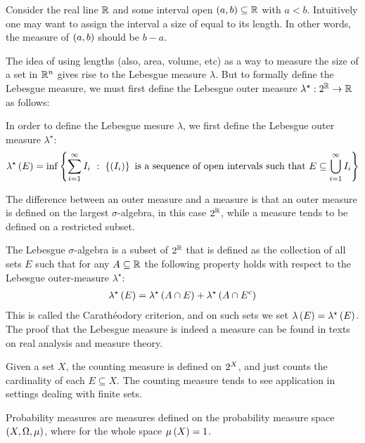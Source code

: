 \begin{example}
  Consider the real line \(\mathbb{R}\)
  and some interval open \(\left(a, b\right) \subseteq \mathbb{R}\) with \(a < b\).
  Intuitively one may want to assign the interval a size of
  equal to its length.
  In other words, the measure of \(\left(a, b\right)\) should be \(b - a\).

  The idea of using lengths (also, area, volume, etc) as a way to measure
  the size of a set in \(\mathbb{R}^n\) gives rise to the Lebesgue measure
  \(\lambda\).
  But to formally define the Lebesgue measure, we must first
  define the Lebesgue outer measure
  \(\lambda^\star : 2^{\mathbb{R}} \to \mathbb{R}\) as follows:
  
  In order to define the Lebesgue mesure \(\lambda\),
  we first define the Lebesgue outer measure \(\lambda^\star\):
  \begin{align*}
    \lambda^\star \parens{E}
      = \inf\braces{\sum_{i = 1}^{\infty} I_i \st
                      \braces{\parens{I_i}}
                      \ \text{is a sequence of open intervals such that} \ 
                      E \subseteq \bigcup_{i = 1}^{\infty} {I_i}}
  \end{align*}

  The difference between an outer measure and a measure is that
  an outer measure is defined on the largest \(\sigma\)-algebra,
  in this case \(2^{\mathbb{R}}\),
  while a measure tends to be defined on a restricted subset.

  The Lebesgue \(\sigma\)-algebra is a subset of \(2^{\mathbb{R}}\) that
  is defined as the collection of all sets \(E\) such that
  for any \(A \subseteq \mathbb{R}\) the following property holds with respect
  to the Lebesgue outer-measure \(\lambda^\star\):
  \begin{align*}
    \lambda^\star \left(E\right)
      = \lambda^\star \left(A \cap E\right) + \lambda^\star \left(A \cap E^c\right)
  \end{align*}
  This is called the Carath{\'e}odory criterion,
  and on such sets we set \(\lambda\left(E\right) = \lambda^\star \left(E\right)\).
  The proof that the Lebesgue measure is indeed a measure can be found
  in texts on real analysis and measure theory.

\end{example}



\begin{example}
  Given a set \(X\),
  the counting measure is defined on \(2^{X}\),
  and just counts the cardinality of each \(E \subseteq X\).
  The counting measure tends to see application in settings
  dealing with finite sets.
\end{example}

\begin{example}
  Probability measures are measures
  defined on the probability measure space
  \(\left(X, \Omega, \mu\right)\),
  where for the whole space \(\mu\left(X\right) = 1\).
\end{example}


